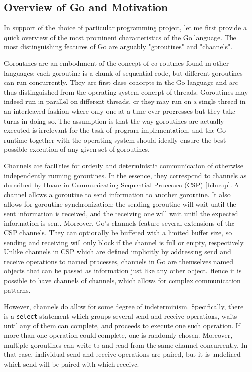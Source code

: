 \documentclass {article}
\begin{document}
\subsection{Overview of Go and Motivation}

In support of the choice of particular programming project, let me first provide a quick overview of the most prominent characteristics of the Go language. The most distinguishing features of Go are arguably "goroutines" and "channels".

Goroutines are an embodiment of the concept of co-routines found in other languages: each goroutine is a chunk of sequential code, but different goroutines can run concurrently. They are first-class concepts in the Go language and are thus distinguished from the operating system concept of threads. Goroutines may indeed run in parallel on different threads, or they may run on a single thread in an interleaved fashion where only one at a time ever progresses but they take turns in doing so. The assumption is that the way goroutines are actually executed is irrelevant for the task of program implementation, and the Go runtime together with the operating system should ideally ensure the best possible execution of any given set of goroutines.

Channels are facilities for orderly and deterministic communication of otherwise independently running goroutines. In the essence, they correspond to channels as described by Hoare in Communicating Sequential Processes (CSP) \ref{bib:csp}. A channel allows a goroutine to send information to another goroutine. It also allows for goroutine synchronization: the sending goroutine will wait until the sent information is received, and the receiving one will wait until the expected information is sent. Moreover, Go's channels feature several extensions of the CSP channels. They can optionally be buffered with a limited buffer size, so sending and receiving will only block if the channel is full or empty, respectively. Unlike channels in CSP which are defined implicitly by addressing send and receive operations to named processes, channels in Go are themselves named objects that can be passed as information just like any other object. Hence it is possible to have channels of channels, which allows for complex communication patterns.

However, channels do allow for some degree of indeterminism. Specifically, there is a \lstinline|select| statement which groups several send and receive operations, waits until any of them can complete, and proceeds to execute one such operation. If more than one operation could complete, one is randomly chosen. Moreover, multiple goroutines can write to and read from the same channel concurrently. In that case, individual send and receive operations are paired, but it is undefined which send will be paired with which receive.
\end{document}
